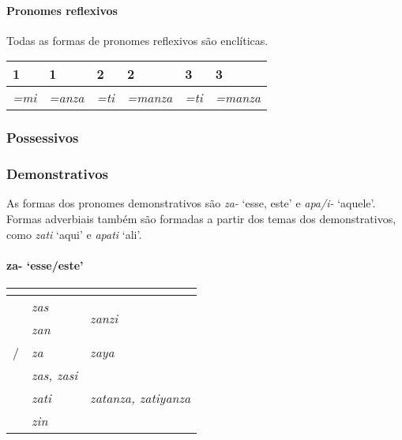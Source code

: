 \paragraph{Pronomes reflexivos}
Todas as formas de pronomes reflexivos são enclíticas.

\begin{center}
	\begin{tabular}[c]{ll|ll|ll}
		\toprule
		1\Sg{}\emph{} & 1\Pl{}\emph{} & 2\Sg{}\emph{} & 2\Pl{}\emph{} & 3\Sg{}\emph{} & 3\Pl{}\emph{} \\
		\midrule
		\emph{=mi}    & \emph{=anza}  & \emph{=ti}    & \emph{=manza} & \emph{=ti}    & \emph{=manza} \\
		\bottomrule
	\end{tabular}
\end{center}

\subsubsection{Possessivos}

\subsubsection{Demonstrativos}
As formas dos pronomes demonstrativos são \emph{za-} `esse, este' e
\emph{apa\slash{}i-} `aquele'.
Formas adverbiais também são formadas a partir dos temas dos demonstrativos,
como \emph{zati} `aqui' e \emph{apati} `ali'.

\paragraph{za- `esse/este'}

\begin{center}
	\begin{tabular}[c]{lll}
		\toprule
		                 & \Sg{}\emph{}     & \Pl{}\emph{}                    \\
		\midrule
		\Nom{} \Com{}    & \emph{zas}       & \multirow{2}{4em}{\emph{zanzi}} \\
		\Acu{} \Com{}    & \emph{zan}       &                                 \\
		\Nom/\Acu\Neut{} & \emph{za}        & \emph{zaya}                     \\
		\Gen{}           & \emph{zas, zasi} &                                 \\
		\Dat{}           & \emph{zati}      & \emph{zatanza, zatiyanza}       \\
		\Abl{}           & \emph{zin}       & \emph{}                         \\
		\bottomrule
	\end{tabular}
\end{center}

